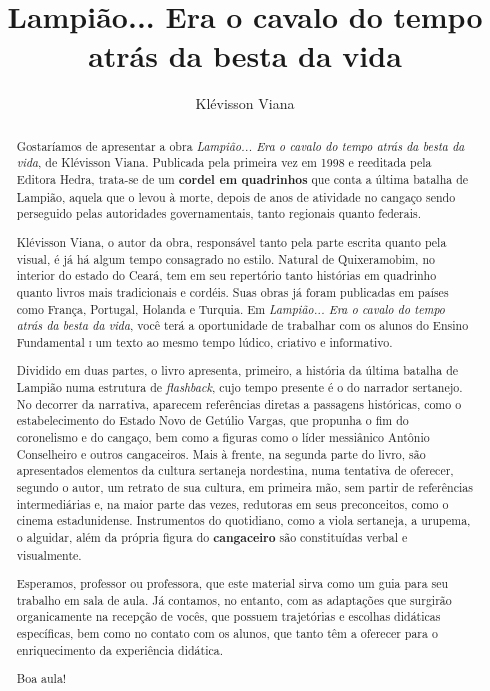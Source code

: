 \documentclass[11pt]{extarticle}
\newcommand{\AutorLivro}{Klévisson Viana}
\newcommand{\TituloLivro}{Lampião... Era o cavalo do tempo atrás da besta da vida}
\newcommand{\colaborador}{Renier Silva}
\begin{document}
\title{\TituloLivro}
\author{\AutorLivro}
\def\authornotes{\colaborador}

\date{}
\maketitle

\tableofcontents


\begin{abstract}

Gostaríamos de apresentar a obra \textit{Lampião... Era o cavalo do tempo atrás da besta da vida},
de Klévisson Viana. Publicada pela primeira vez em 1998 e reeditada pela Editora Hedra, 
trata-se de um \textbf{cordel em quadrinhos} que conta a última batalha de Lampião, aquela que 
o levou à morte, depois de anos de atividade no cangaço sendo perseguido pelas autoridades governamentais,
tanto regionais quanto federais. 

Klévisson Viana, o autor da obra, responsável tanto pela parte escrita quanto pela visual, 
é já há algum tempo consagrado no estilo. Natural de Quixeramobim, no interior do estado do Ceará,
tem em seu repertório tanto histórias em quadrinho quanto livros mais tradicionais e cordéis. 
Suas obras já foram publicadas em países como França, Portugal, Holanda e Turquia. 
Em \textit{Lampião... Era o cavalo do tempo atrás da besta da vida}, você terá a oportunidade de trabalhar com 
os alunos do Ensino Fundamental \textsc{i} um texto ao mesmo tempo lúdico, criativo e informativo. 

Dividido em duas partes, o livro apresenta, primeiro, a história da última batalha de Lampião
numa estrutura de \textit{flashback}, cujo tempo presente é o do narrador sertanejo. 
No decorrer da narrativa, aparecem referências diretas a passagens históricas, como o estabelecimento 
do Estado Novo de Getúlio Vargas, que propunha o fim do coronelismo e do cangaço,
bem como a figuras como o líder messiânico Antônio Conselheiro e outros cangaceiros. 
Mais à frente, na segunda parte do livro, são apresentados elementos da cultura sertaneja nordestina, numa tentativa de oferecer,
segundo o autor, um retrato de sua cultura, em primeira mão, 
sem partir de referências intermediárias e, na maior parte das vezes, redutoras
em seus preconceitos, como o cinema estadunidense. Instrumentos do quotidiano, como a viola sertaneja,
a urupema, o alguidar, além da própria figura do \textbf{cangaceiro} são constituídas verbal e visualmente. 

Esperamos, professor ou professora, que este material sirva como um guia 
para seu trabalho em sala de aula. Já contamos, no entanto, com as adaptações
que surgirão organicamente na recepção de vocês, que possuem 
trajetórias e escolhas didáticas específicas, bem como no contato com os 
alunos, que tanto têm a oferecer para o enriquecimento da experiência didática.

Boa aula!

\end{abstract}
\end{document}
